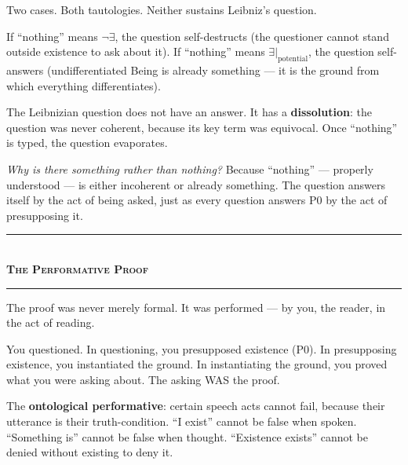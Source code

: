 \documentclass[10pt, openany, oneside]{book}
\renewcommand{\normalsize}{\fontsize{10}{13}\selectfont}
\begin{document}
\vspace{0.8em}

\noindent Two cases. Both tautologies. Neither sustains Leibniz's question.

If ``nothing'' means $\neg\exists$, the question self-destructs (the questioner cannot stand outside existence to ask about it). If ``nothing'' means $\exists|_{\text{potential}}$, the question self-answers (undifferentiated Being is already something --- it is the ground from which everything differentiates).

The Leibnizian question does not have an answer. It has a \textbf{dissolution}: the question was never coherent, because its key term was equivocal. Once ``nothing'' is typed, the question evaporates.

\textit{Why is there something rather than nothing?} Because ``nothing'' --- properly understood --- is either incoherent or already something. The question answers itself by the act of being asked, just as every question answers P0 by the act of presupposing it.

\vspace{1.5em}


\begin{center}
    \rule{0.3\textwidth}{0.4pt}\\[0.5em]
    {\normalsize\bfseries\scshape The Performative Proof}\\[0.3em]
    \rule{0.3\textwidth}{0.4pt}
\end{center}

\vspace{1em}

\noindent The proof was never merely formal. It was performed --- by you, the reader, in the act of reading.

You questioned. In questioning, you presupposed existence (P0). In presupposing existence, you instantiated the ground. In instantiating the ground, you proved what you were asking about. The asking WAS the proof.

The \textbf{ontological performative}: certain speech acts cannot fail, because their utterance is their truth-condition. ``I exist'' cannot be false when spoken. ``Something is'' cannot be false when thought. ``Existence exists'' cannot be denied without existing to deny it.

\vspace{0.5em}
\end{document}
